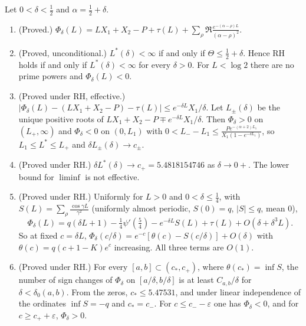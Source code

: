 \begin{theorem}\label{bo:thm:threshold}
Let $0<\delta<\frac12$ and $\alpha=\frac12+\delta$.
\begin{enumerate}
\item (Proved.) $\Phi_\delta(L)=LX_1+X_2-P+\tau(L)+\sum_\rho\Re\frac{e^{-(\alpha-\rho)L}}{(\alpha-\rho)^2}$.
\item (Proved, unconditional.) $L^*(\delta)<\infty$ if and only if $\Theta\le\frac12+\delta$. Hence RH holds if and only if $L^*(\delta)<\infty$ for every $\delta>0$. For $L<\log2$ there are no prime powers and $\Phi_\delta(L)<0$.
\item (Proved under RH, effective.) $\bigl|\Phi_\delta(L)-(LX_1+X_2-P)-\tau(L)\bigr|\le e^{-\delta L}X_1/\delta$. Let $L_\pm(\delta)$ be the unique positive roots of $LX_1+X_2-P\mp e^{-\delta L}X_1/\delta$. Then $\Phi_\delta>0$ on $(L_+,\infty)$ and $\Phi_\delta<0$ on $(0,L_1)$ with $0<L_--L_1\le\frac{Pe^{-(\alpha+2)L_1}}{X_1(1-e^{-\delta L_1})}$, so $L_1\le L^*\le L_+$ and $\delta L_\pm(\delta)\to c_\pm$.
\item (Proved under RH.) $\delta L^*(\delta)\to c_+=5.4818154746$ as $\delta\to0+$. The lower bound for $\liminf$ is not effective.
\item (Proved under RH.) Uniformly for $L>0$ and $0<\delta\le\frac14$, with $S(L)=\sum_\rho\frac{\cos\gamma L}{\gamma^2}$ (uniformly almost periodic, $S(0)=q$, $|S|\le q$, mean $0$),
\[
\Phi_\delta(L)=q(\delta L+1)-\tfrac14\psi'(\tfrac54)-e^{-\delta L}S(L)+\tau(L)+O(\delta+\delta^3L).
\]
So at fixed $c=\delta L$, $\Phi_\delta(c/\delta)=e^{-c}[\theta(c)-S(c/\delta)]+O(\delta)$ with $\theta(c)=q(c+1-K)e^c$ increasing. All three terms are $O(1)$.
\item (Proved under RH.) For every $[a,b]\subset(c_*,c_+)$, where $\theta(c_*)=\inf S$, the number of sign changes of $\Phi_\delta$ on $[a/\delta,b/\delta]$ is at least $C_{a,b}/\delta$ for $\delta<\delta_0(a,b)$. From the zeros, $c_*\le5.47531$, and under linear independence of the ordinates $\inf S=-q$ and $c_*=c_-$. For $c\le c_--\varepsilon$ one has $\Phi_\delta<0$, and for $c\ge c_++\varepsilon$, $\Phi_\delta>0$.
\end{enumerate}
\end{theorem}

